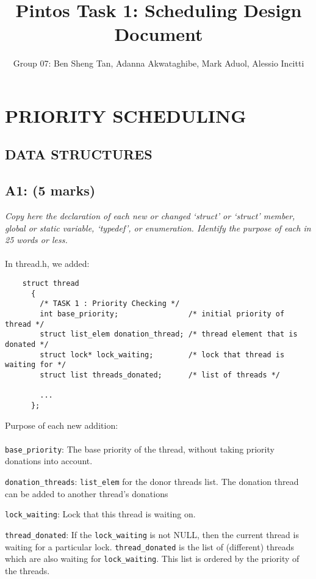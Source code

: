 \documentclass{article}
\title{Pintos Task 1: Scheduling Design Document}
\author{Group 07: Ben Sheng Tan, Adanna Akwataghibe, Mark Aduol, Alessio Incitti }
\begin{document}
\maketitle

\section{PRIORITY SCHEDULING}

\subsection{ DATA STRUCTURES}

\subsection*{A1: (5 marks) }

\textit{Copy here the declaration of each new or changed ‘struct’ or ‘struct’ member, global or static variable, ‘typedef’, or enumeration. Identify the purpose of each in 25 words or less.}
\\ \\
In thread.h, we added:
\begin{lstlisting}
    struct thread
      {
        /* TASK 1 : Priority Checking */
        int base_priority;                /* initial priority of thread */
        struct list_elem donation_thread; /* thread element that is donated */
        struct lock* lock_waiting;        /* lock that thread is waiting for */
        struct list threads_donated;      /* list of threads */

        ...
      };

\end{lstlisting}

Purpose of each new addition:
\\ \\
\texttt{base\_priority}: The base priority of the thread, without taking priority donations into account.

\texttt{donation\_threads}: \texttt{list\_elem} for the donor threads list. The donation thread can be added to another thread's donations

\texttt{lock\_waiting}: Lock that this thread is waiting on.

\texttt{thread\_donated}:  If the \texttt{lock\_waiting} is not NULL, then the current thread is
     waiting for a particular lock. \texttt{thread\_donated} is the list of
     (different) threads which are also waiting for \texttt{lock\_waiting}. This list is ordered by the priority of the threads.
\end{document}

